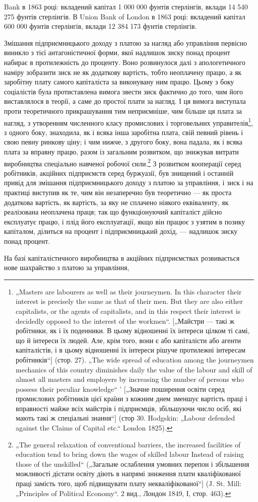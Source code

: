 Bank в 1863 році: вкладений капітал 1 000 000 фунтів стерлінгів,
вклади 14 540 275 фунтів стерлінгів. В Union Bank of London в
1863 році: вкладений капітал 600 000 фунтів стерлінгів, вклади
12 384 173 фунтів стерлінгів.

Змішання підприємницького доходу з платою за нагляд
або управління первісно виникло з тієї антагоністичної форми,
якої надлишок зиску понад процент набирає в протилежність
до проценту. Воно розвинулося далі з апологетичного наміру
зобразити зиск не як додаткову вартість, тобто неоплачену працю,
а як заробітну плату самого капіталіста за виконувану ним працю.
Цьому з боку соціалістів була протиставлена вимога звести зиск
фактично до того, чим його виставлялося в теорії, а саме до простої
плати за нагляд. І ця вимога виступала проти теоретичного
прикрашування тим неприємніше, чим більше ця плата за нагляд,
з утворенням численного класу промислових і торговельних
управителів\footnote{
„Masters are labourers as well as their journeymen. In this character their
interest is precisely the same as that of their men. But they are also either capitalists,
or the agents of capitalists, and in this respect their interest is decidedly
opposed to the interest of the workmen“. [„Майстри — такі ж робітники, як і їх
поденники. В цьому відношенні їх інтереси цілком ті самі, що й інтереси їх людей.
Але, крім того, вони є або капіталісти або агенти капіталістів, і в цьому відношенні
їх інтереси рішуче протилежні інтересам робітників“] (стор. 27). „The
wide spread of education among the journeymen mechanics of this country diminishes
daily the value of the labour and skill of almost all masters and employers
by increasing the number of persons who possess their peculiar knowledge“ ' [„Значне
поширення освіти серед промислових робітників цієї країни з кожним днем
зменшує вартість праці і вправності майже всіх майстрів і підприємців, збільшуючи
число осіб, які мають такі ж спеціальні знання“] (стор 30. Hodgskin:
„Labour defended against the Claims of Capital etc.“ London 1825).
}, з одного боку, знаходила, як і всяка інша заробітна
плата, свій певний рівень і свою певну ринкову ціну; і чим
нижче, з другого боку, вона падала, як і всяка плата за вправну
працю, разом із загальним розвитком, що знижував витрати виробництва
спеціально навченої робочої сили.\footnote{
„The general relaxation of conventional barriers, the increased facilities of education
tend to bring down the wages of skilled labour Instead of raising those of
the unskilled“ („Загальне ослаблення умовних перепон і збільшення можливості
дістати освіту діють в напрямі зниження плати кваліфікованої праці замість
того, щоб підвищувати плату некваліфікованої“] (J. St. Mill: „Principles of Political
Economy“. 2 вид., Лондон 1849, І, стор. 463).
} З розвитком кооперації
серед робітників, акційних підприємств серед буржуазії,
був знищений і останній привід для змішання підприємницького
доходу з платою за управління, і зиск і на практиці
виступив як те, чим він незаперечно був теоретично — як проста
додаткова вартість, як вартість, за яку не сплачено ніякого
еквіваленту, як реалізована неоплачена праця; так що функціонуючий
капіталіст дійсно експлуатує працю, і плід його експлуатації,
якщо він працює з узятим в позику капіталом, ділиться на процент
і підприємницький дохід, — надлишок зиску понад процент.

На базі капіталістичного виробництва в акційних підприємствах
розвивається нове шахрайство з платою за управління,